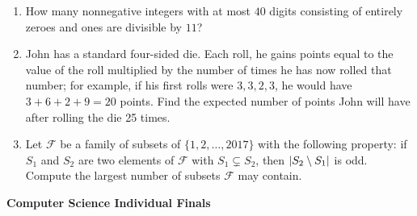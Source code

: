 \documentclass[10pt]{article}
\DeclarePairedDelimiter\abs{\lvert}{\rvert}
\begin{document}
\begin{enumerate}


\item How many nonnegative integers with at most $40$ digits consisting of entirely zeroes and ones are divisible by $11$?

\item John has a standard four-sided die. Each roll, he gains points equal to the value of the roll multiplied by the number of times he has now rolled that number; for example, if his first rolls were $3,3,2,3$, he would have $3+6+2+9=20$ points. Find the expected number of points John will have after rolling the die 25 times.

\item Let $\mathcal{F}$ be a family of subsets of $\{1,2,\ldots, 2017\}$ with the following property: if $S_1$ and $S_2$ are two elements of $\mathcal{F}$ with $S_1\subsetneq S_2$, then $\abs{S_2\setminus S_1}$ is odd. Compute the largest number of subsets $\mathcal{F}$ may contain.

\end{enumerate}

\newpage

\begin{center}
\huge\textbf{Computer Science Individual Finals}
\end{center} \vspace{3pt}
\end{document}
